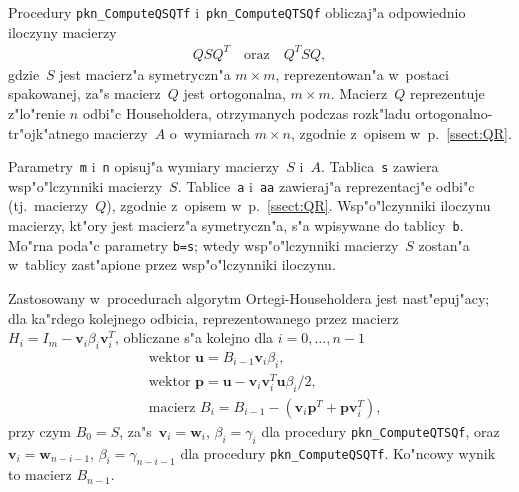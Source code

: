 \vspace{\bigskipamount}
Procedury \texttt{pkn\_ComputeQSQTf} i~\texttt{pkn\_ComputeQTSQf} obliczaj"a
odpowiednio iloczyny macierzy
\begin{align*}
  QSQ^T \quad\mbox{oraz}\quad Q^TSQ,
\end{align*}
gdzie~$S$ jest macierz"a symetryczn"a $m\times m$, reprezentowan"a
w~postaci spakowanej, za"s macierz~$Q$ jest ortogonalna, $m\times m$.
Macierz~$Q$ reprezentuje z"lo"renie $n$ odbi"c Householdera, otrzymanych
podczas rozk"ladu ortogonalno-tr"ojk"atnego macierzy~$A$ o~wymiarach
$m\times n$, zgodnie z~opisem w~p.~\ref{ssect:QR}.

Parametry~\texttt{m} i~\texttt{n} opisuj"a wymiary macierzy~$S$ i~$A$.
Tablica~\texttt{s} zawiera wsp"o"lczynniki macierzy~$S$. Tablice~\texttt{a}
i~\texttt{aa} zawieraj"a reprezentacj"e odbi"c (tj.\ macierzy~$Q$), zgodnie
z~opisem w~p.~\ref{ssect:QR}. Wsp"o"lczynniki iloczynu macierzy, kt"ory jest
macierz"a symetryczn"a, s"a wpisywane do tablicy~\texttt{b}.
Mo"rna poda"c parametry \texttt{b=s}; wtedy wsp"o"lczynniki macierzy~$S$
zostan"a w~tablicy zast"apione przez wsp"o"lczynniki iloczynu.

Zastosowany w~procedurach algorytm Ortegi-Householdera jest nast"epuj"acy;
dla ka"rdego kolejnego odbicia, reprezentowanego przez
macierz~$H_i=I_m-\bm{v}_i\beta_i\bm{v}_i^T$, obliczane s"a kolejno
dla $i=0,\ldots,n-1$
\begin{align*}
  &\mbox{wektor } \bm{u} = B_{i-1}\bm{v}_i\beta_i, \\
  &\mbox{wektor } \bm{p} = \bm{u}-\bm{v}_i\bm{v}_i^T\bm{u}\beta_i/2, \\
  &\mbox{macierz } B_i = B_{i-1} - (\bm{v}_i\bm{p}^T+\bm{p}\bm{v}_i^T),
\end{align*}
przy czym $B_0=S$, za"s~$\bm{v}_i=\bm{w}_i$, $\beta_i=\gamma_i$
dla procedury \texttt{pkn\_ComputeQTSQf}, oraz
$\bm{v}_i=\bm{w}_{n-i-1}$, $\beta_i=\gamma_{n-i-1}$ dla procedury
\texttt{pkn\_ComputeQSQTf}. Ko"ncowy wynik to macierz $B_{n-1}$.

